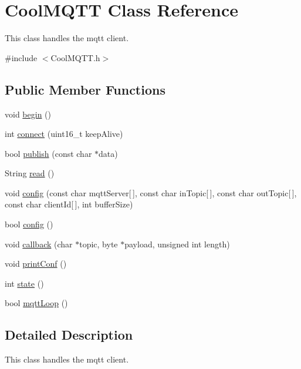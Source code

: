 \hypertarget{class_cool_m_q_t_t}{}\section{Cool\+M\+Q\+TT Class Reference}
\label{class_cool_m_q_t_t}


This class handles the mqtt client.  




{\ttfamily \#include $<$Cool\+M\+Q\+T\+T.\+h$>$}

\subsection*{Public Member Functions}
\begin{DoxyCompactItemize}
\item 
void \hyperlink{class_cool_m_q_t_t_ac9248808641ebf3054ed0620ea9d0100}{begin} ()
\item 
int \hyperlink{class_cool_m_q_t_t_a58b0b1f64b269c2681685208262fba1d}{connect} (uint16\+\_\+t keep\+Alive)
\item 
bool \hyperlink{class_cool_m_q_t_t_ace977b3e90ab14b1199fe5c4fb0a13ec}{publish} (const char $\ast$data)
\item 
String \hyperlink{class_cool_m_q_t_t_ae3c18f6ae9723746d32765f1c8f176ca}{read} ()
\item 
void \hyperlink{class_cool_m_q_t_t_a0158596b9a2297c8ba609b56ce6bace1}{config} (const char mqtt\+Server\mbox{[}$\,$\mbox{]}, const char in\+Topic\mbox{[}$\,$\mbox{]}, const char out\+Topic\mbox{[}$\,$\mbox{]}, const char client\+Id\mbox{[}$\,$\mbox{]}, int buffer\+Size)
\item 
bool \hyperlink{class_cool_m_q_t_t_a6571671781a505feca9a8a56e256c6bc}{config} ()
\item 
void \hyperlink{class_cool_m_q_t_t_a30d82ad665bfb603f46ecdbc290775df}{callback} (char $\ast$topic, byte $\ast$payload, unsigned int length)
\item 
void \hyperlink{class_cool_m_q_t_t_a40553a0ad4b5ecf1cb4411ab54ca85fb}{print\+Conf} ()
\item 
int \hyperlink{class_cool_m_q_t_t_a5d003307eff78efbd585e42b43b72b6d}{state} ()
\item 
bool \hyperlink{class_cool_m_q_t_t_aa5eaae967b562b62cbcf2b8d81f6e5d5}{mqtt\+Loop} ()
\end{DoxyCompactItemize}


\subsection{Detailed Description}
This class handles the mqtt client. 

